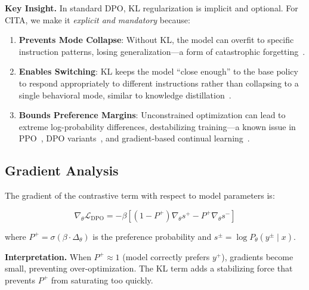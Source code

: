 \textbf{Key Insight.} In standard DPO, KL regularization is implicit and optional. For CITA, we make it \textit{explicit and mandatory} because:

\begin{enumerate}[leftmargin=*,itemsep=2pt]
    \item \textbf{Prevents Mode Collapse}: Without KL, the model can overfit to specific instruction patterns, losing generalization---a form of catastrophic forgetting~\cite{french1999catastrophic,kirkpatrick2017overcoming}.

    \item \textbf{Enables Switching}: KL keeps the model ``close enough'' to the base policy to respond appropriately to different instructions rather than collapsing to a single behavioral mode, similar to knowledge distillation~\cite{hinton2015distilling}.

    \item \textbf{Bounds Preference Margins}: Unconstrained optimization can lead to extreme log-probability differences, destabilizing training---a known issue in PPO~\cite{schulman2017proximal}, DPO variants~\cite{azar2023general,zhao2023slic}, and gradient-based continual learning~\cite{lopez2017gradient}.
\end{enumerate}

\vspace{-2mm}
\subsection{Gradient Analysis}
\label{sec:gradient}

The gradient of the contrastive term with respect to model parameters is:

\begin{equation}
\nabla_\theta \mathcal{L}_{\text{DPO}} = -\beta \left[ (1 - P^+) \nabla_\theta s^+ - P^+ \nabla_\theta s^- \right]
\label{eq:gradient}
\end{equation}

where $P^+ = \sigma(\beta \cdot \Delta_\theta)$ is the preference probability and $s^{\pm} = \log P_\theta(y^{\pm} \mid x)$.

\textbf{Interpretation.} When $P^+ \approx 1$ (model correctly prefers $y^+$), gradients become small, preventing over-optimization. The KL term adds a stabilizing force that prevents $P^+$ from saturating too quickly.
